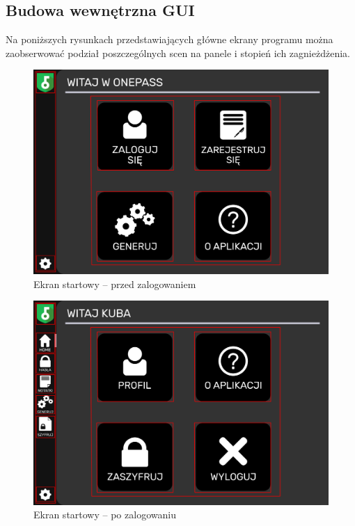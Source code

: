 \documentclass[a4paper]{article}
\begin{document}
\subsection{Budowa wewnętrzna GUI}
Na poniższych rysunkach przedstawiających główne ekrany programu można zaobserwować podział poszczególnych scen na panele i stopień ich zagnieżdżenia.
\begin{figure}[H]
    \centering
    \includegraphics[width=1\textwidth]{img/ekran_przed_zalogowaniem.png}
    \caption{Ekran startowy -- przed zalogowaniem}
    \label{fig:startPrzed}
\end{figure}

\begin{figure}[H]
    \centering
    \includegraphics[width=1\textwidth]{img/ekran_po_zalogowaniu.png}
    \caption{Ekran startowy -- po zalogowaniu}
    \label{fig:startPo}
\end{figure}
\end{document}
